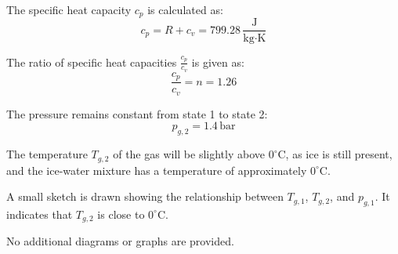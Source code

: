 The specific heat capacity \( c_p \) is calculated as:  
\[
c_p = R + c_v = 799.28 \, \frac{\text{J}}{\text{kg·K}}
\]  

The ratio of specific heat capacities \( \frac{c_p}{c_v} \) is given as:  
\[
\frac{c_p}{c_v} = n = 1.26
\]  

The pressure remains constant from state 1 to state 2:  
\[
p_{g,2} = 1.4 \, \text{bar}
\]  

The temperature \( T_{g,2} \) of the gas will be slightly above \( 0^\circ\text{C} \), as ice is still present, and the ice-water mixture has a temperature of approximately \( 0^\circ\text{C} \).  

A small sketch is drawn showing the relationship between \( T_{g,1} \), \( T_{g,2} \), and \( p_{g,1} \). It indicates that \( T_{g,2} \) is close to \( 0^\circ\text{C} \).  

No additional diagrams or graphs are provided.
